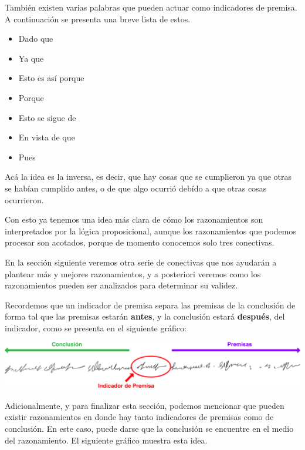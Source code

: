 También existen varias palabras que pueden actuar como indicadores de premisa. A
continuación se presenta una breve lista de estos.

\begin{minipage}{0.45\textwidth}
    \begin{itemize}
        \item Dado que
        \item Ya que
        \item Esto es así porque
        \item Porque
    \end{itemize}
\end{minipage}
\begin{minipage}{0.45\textwidth}
    \begin{itemize}
        \item Esto se sigue de
        \item En vista de que
        \item Pues
    \end{itemize}
\end{minipage}

Acá la idea es la inversa, es decir, que hay cosas que se cumplieron ya que
otras se habían cumplido antes, o de que algo ocurrió debído a que otras cosas
ocurrieron.

Con esto ya tenemos una idea más clara de cómo los razonamientos son
interpretados por la lógica proposicional, aunque los razonamientos que podemos
procesar son acotados, porque de momento conocemos solo tres conectivas.

En la sección siguiente veremos otra serie de conectivas que nos ayudarán a
plantear más y mejores razonamientos, y a posteriori veremos como los
razonamientos pueden ser analizados para determinar su validez.

Recordemos que un indicador de premisa separa las premisas de la conclusión de
forma tal que las premisas estarán \textbf{antes}, y la conclusión estará
\textbf{después}, del indicador, como se presenta en el siguiente gráfico:

\includegraphics[scale=0.5]{unidades/3_logica/2_logica_proposicional/imagenes/indicadores_premisa.png}

Adicionalmente, y para finalizar esta sección, podemos mencionar que pueden
existir razonamientos en donde hay tanto indicadores de premisas como de
conclusión. En este caso, puede darse que la conclusión se encuentre en el medio
del razonamiento. El siguiente gráfico muestra esta idea.

